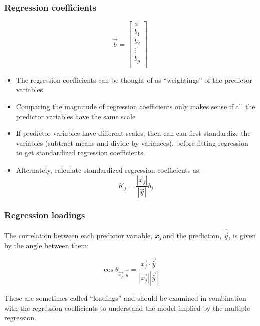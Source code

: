 \documentclass{beamer}
\begin{document}
\begin{frame}
  \frametitle{Regression coefficients}

\[
\vec{b} = \left[ \begin{array}{c}
a \\ b_1 \\ b_2 \\ \vdots \\ b_p \\
\end{array}
\right] 
\]


\begin{itemize}
    \item The regression coefficients can be thought of as ``weightings'' of the predictor variables
    \item Comparing the magnitude of regression coefficients only makes sense if all the predictor variables have the same scale
    \item If predictor variables have different scales, then can can first standardize the variables (subtract means and divide by variances), before fitting regression to get standardized regression coefficients.  
    \item Alternately, calculate standardized regression coefficients as:
        \[
        b'_j = \frac{|\vec{x}_j|}{|\vec{y}|} b_j
        \]
\end{itemize}

\end{frame}



\begin{frame}
  \frametitle{Regression loadings}

The correlation between each predictor variable, $\bm{x}_j$and the prediction, $\hat{\vec{y}}$, is given by the angle between them:

        \[
        \cos \theta_{\vec{x_j},\vec{\widehat{y}}} = \frac{\vec{x_j} \cdot \vec{\widehat{y}}}{|\vec{x_j}||\vec{\widehat{y}}|}
        \]

\medskip

These are sometimes called ``loadings'' and should be examined in combination with the regression coefficients to understand the model implied by the multiple regression.

\begin{center}
\end{center}


\end{frame}
\end{document}
